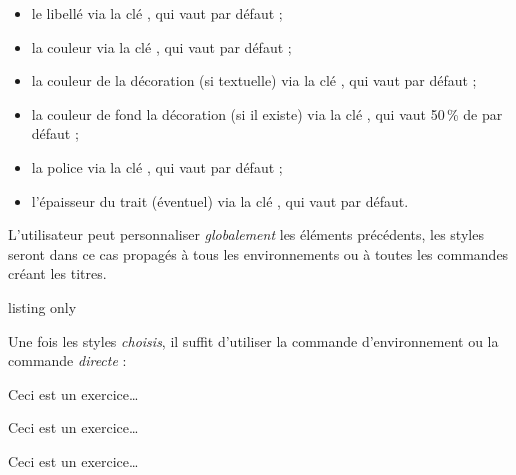 \documentclass[french,11pt,a4paper]{article}
\begin{document}
\begin{itemize}
	\item le libellé via la clé \MontreCode{[Libelle]}, qui vaut  par défaut ;
	\item la couleur via la clé \MontreCode{[Couleur]}, qui vaut  par défaut ;
	\item la couleur de la décoration (si textuelle) via la clé \MontreCode{[CouleurDeco]}, qui vaut  par défaut ;
	\item la couleur de fond la décoration (si il existe) via la clé \MontreCode{[CouleurFondDeco]}, qui vaut 50\,\% de  par défaut ;
	\item la police via la clé \MontreCode{[Police]}, qui vaut  par défaut ;
	\item l'épaisseur du trait (éventuel) via la clé \MontreCode{[EpTrait]}, qui vaut \MontreCode{1.1pt} par défaut.
\end{itemize}

L'utilisateur peut personnaliser \textit{globalement} les éléments précédents, les styles seront dans ce cas propagés à tous les environnements ou à toutes les commandes créant les titres.

\begin{DemoCode}{listing only}
\StyleEnvtExo[clés]

\StyleEnvtExoDefaut
\end{DemoCode}

Une fois les styles \textit{choisis}, il suffit d'utiliser la commande d'environnement ou la commande \textit{directe} :

\begin{DemoCode}{}
\begin{EnvtExo}
Ceci est un exercice\ldots
\end{EnvtExo}

\begin{EnvtExoAlt}
Ceci est un exercice\ldots
\end{EnvtExoAlt}
\end{DemoCode}

\begin{DemoCode}{}
\TitreExo

Ceci est un exercice\ldots
\end{DemoCode}
\end{document}
